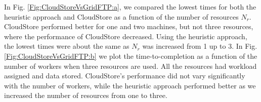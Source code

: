 \documentclass{rspublic}
\begin{document}
In Fig.  \ref{Fig:CloudStoreVsGridFTP:a}, we compared the lowest times
for both the heuristic approach and CloudStore as a function of the
number of resources $N_r$. CloudStore performed better for one and two
machines, but not three resources, where the performance of CloudStore
decreased. Using the heuristic approach, the lowest times were about
the same as $N_r$ was increased from 1 up to 3. In
Fig. \ref{Fig:CloudStoreVsGridFTP:b} we plot the time-to-completion as
a function of the number of workers when three resources are used. All
the resources had workload assigned and data stored. CloudStore's
performance did not vary significantly with the number of workers,
while the heuristic approach performed better as we increased the
number of resources from one to three.

\begin{figure}
\begin{center}
\end{center}
\end{figure}
\end{document}
